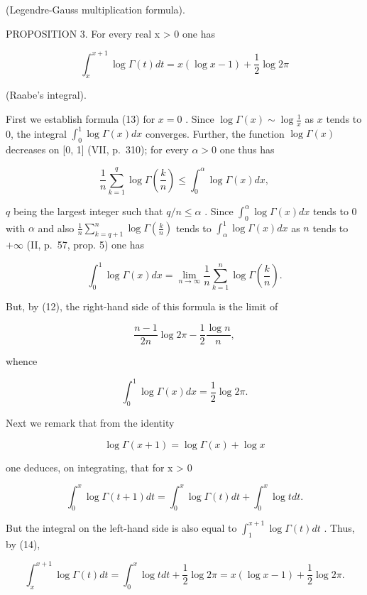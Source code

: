 (Legendre-Gauss multiplication formula).

PROPOSITION 3. For every real x \textgreater{} 0 one has

\[
\int_ {x} ^ {x + 1} \log \Gamma (t) d t = x (\log x - 1) + \frac {1}{2} \log 2 \pi\tag{13}
\]

(Raabe's integral).

First we establish formula (13) for \(x = 0\) . Since \(\log \Gamma(x) \sim \log \frac{1}{x}\) as \(x\) tends to 0, the integral \(\int_0^1 \log \Gamma(x) dx\) converges. Further, the function \(\log \Gamma(x)\) decreases on {[}0, 1{]} (VII, p.~310); for every \(\alpha > 0\) one thus has

\[
\frac {1}{n} \sum_ {k = 1} ^ {q} \log \Gamma \left(\frac {k}{n}\right) \leqslant \int_ {0} ^ {\alpha} \log \Gamma (x) d x,
\]

\(q\) being the largest integer such that \(q / n \leqslant \alpha\) . Since \(\int_{0}^{\alpha} \log \Gamma(x) dx\) tends to 0 with \(\alpha\) and also \(\frac{1}{n} \sum_{k=q+1}^{n} \log \Gamma\left(\frac{k}{n}\right)\) tends to \(\int_{\alpha}^{1} \log \Gamma(x) dx\) as \(n\) tends to \(+\infty\) (II, p.~57, prop. 5) one has

\[
\int_ {0} ^ {1} \log \Gamma (x) d x = \lim _ {n \rightarrow \infty} \frac {1}{n} \sum_ {k = 1} ^ {n} \log \Gamma \left(\frac {k}{n}\right).
\]

But, by (12), the right-hand side of this formula is the limit of

\[
\frac {n - 1}{2 n} \log 2 \pi - \frac {1}{2} \frac {\log n}{n},
\]

whence

\[
\int_ {0} ^ {1} \log \Gamma (x) d x = \frac {1}{2} \log 2 \pi .\tag{14}
\]

Next we remark that from the identity

\[
\log \Gamma (x + 1) = \log \Gamma (x) + \log x
\]

one deduces, on integrating, that for x \textgreater{} 0

\[
\int_ {0} ^ {x} \log \Gamma (t + 1) d t = \int_ {0} ^ {x} \log \Gamma (t) d t + \int_ {0} ^ {x} \log t d t.
\]

But the integral on the left-hand side is also equal to \(\int_{1}^{x + 1}\log \Gamma (t)dt\) . Thus, by (14),

\[
\int_ {x} ^ {x + 1} \log \Gamma (t) d t = \int_ {0} ^ {x} \log t d t + \frac {1}{2} \log 2 \pi = x (\log x - 1) + \frac {1}{2} \log 2 \pi .
\]

